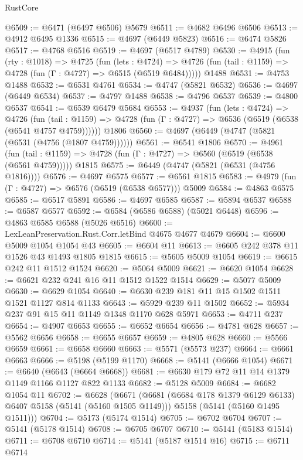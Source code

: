 \begin{lexlean}{RustCore}
\begin{coremodule}
@6509 := @6471 (@6497 @6506) @5679
@6511 := @4682 @6496 @6506
@6513 := @4912 @6495 @1336
@6515 := @4697 (@6449 @5823)
@6516 := @6474 @5826
@6517 := @4768 @6516
@6519 := @4697 (@6517 @4789)
@6530 := @4915
    (fun (rty : @1018) =>
    @4725
      (fun (lets : @4724) =>
      @4726 (fun (tail : @1159) => @4728 (fun (Γ : @4727) => @6515 (@6519 @6484)))))
    @1488
@6531 := @4753 @1488
@6532 := @6531 @4761
@6534 := @4747 (@5821 @6532)
@6536 := @4697 (@6449 @6534)
@6537 := @4797 @1488
@6538 := @4796 @6537
@6539 := @4800 @6537
@6541 := @6539 @6479 @5684
@6553 := @4937
    (fun (lets : @4724) =>
    @4726
      (fun (tail : @1159) => @4728 (fun (Γ : @4727) => @6536 (@6519 (@6538 (@6541 @4757 @4759))))))
    @1806
@6560 := @4697 (@6449 (@4747 (@5821 (@6531 (@4756 (@1807 @4759))))))
@6561 := @6541 @1806
@6570 := @4961
    (fun (tail : @1159) => @4728 (fun (Γ : @4727) => @6560 (@6519 (@6538 (@6561 @4759)))))
    @1815
@6575 := @6449 (@4747 (@5821 (@6531 (@4756 @1816))))
@6576 := @4697 @6575
@6577 := @6561 @1815
@6583 := @4979 (fun (Γ : @4727) => @6576 (@6519 (@6538 @6577))) @5009
@6584 := @4863 @6575
@6585 := @6517 @5891
@6586 := @4697 @6585
@6587 := @5894 @6537
@6588 := @6587 @6577
@6592 := @6584 (@6586 @6588) (@5021 @6448)
@6596 := @4863 @6585 @6588 (@5026 @6516)
@6600 := LexLeanPreservation.Rust.Corr.letBind @4675 @4677 @4679
@6604 := @6600 @5009 @1054 @1054 @43
@6605 := @6604 @11
@6613 := @6605 @242 @378 @11 @1526 @43 @1493 @1805 @1815
@6615 := @5605 @5009 @1054
@6619 := @6615 @242 @11 @1512 @1524
@6620 := @5064 @5009
@6621 := @6620 @1054
@6628 := @6621 @232 @241 @16 @11 @1512 @1522 @1514
@6629 := @5077 @5009
@6630 := @6629 @1054
@6640 := @6630 @239 @181 @11 @15 @1502 @1511 @1521 @1127 @814 @1133
@6643 := @5929 @239 @11 @1502
@6652 := @5934 @237 @91 @15 @11 @1149 @1348 @1170 @628 @5971
@6653 := @4711 @237
@6654 := @4907 @6653
@6655 := @6652 @6654
@6656 := @4781 @628
@6657 := @5562 @6656
@6658 := @6655 @6657
@6659 := @4805 @628
@6660 := @5566 @6659
@6661 := @6658 @6660
@6663 := @5571 (@5573 @237)
@6664 := @6661 @6663
@6666 := @5198 (@5199 @1170)
@6668 := @5141 (@6666 @1054)
@6671 := @6640 (@6643 (@6664 @6668))
@6681 := @6630 @179 @72 @11 @14 @1379 @1149 @1166 @1127 @822 @1133
@6682 := @5128 @5009
@6684 := @6682 @1054 @11
@6702 := @6628
    (@6671
      (@6681 (@6684 @178 @1379 @6129 @6133) @6407 @5158 (@5141 (@5160 @1505 @1149)))
      @5158
      (@5141 (@5160 @1495 @1511)))
@6704 := @5173 (@5174 @1514)
@6705 := @6702 @6704
@6707 := @5141 (@5178 @1514)
@6708 := @6705 @6707
@6710 := @5141 (@5183 @1514)
@6711 := @6708 @6710
@6714 := @5141 (@5187 @1514 @16)
@6715 := @6711 @6714

\end{coremodule}
\end{lexlean}
